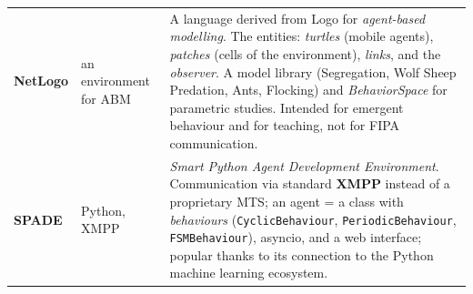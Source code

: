 \documentclass[11pt,a4paper]{article}
\theoremstyle{definition}
\begin{document}
\begin{center}
\begin{tabular}{p{} p{} p{}}
\textbf{NetLogo}
  & an environment for ABM
  & A language derived from Logo for \emph{agent-based modelling}. The entities: \emph{turtles} (mobile
    agents), \emph{patches} (cells of the environment), \emph{links}, and the \emph{observer}. A model
    library (Segregation, Wolf Sheep Predation, Ants, Flocking) and \emph{BehaviorSpace} for parametric
    studies. Intended for emergent behaviour and for teaching, not for FIPA communication. \\
\textbf{SPADE}
  & Python, XMPP
  & \emph{Smart Python Agent Development Environment}. Communication via standard
    \textbf{XMPP} instead of a proprietary MTS; an agent = a class with \emph{behaviours}
    (\texttt{CyclicBehaviour}, \texttt{PeriodicBehaviour}, \texttt{FSMBehaviour}), asyncio, and a
    web interface; popular thanks to its connection to the Python machine learning ecosystem. \\
\bottomrule
\end{tabular}
\end{center}
\end{document}

